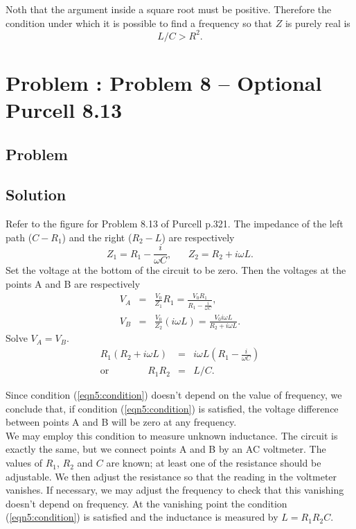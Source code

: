 \documentclass[solutions]{esg8022pset}
\begin{document}
Noth that the argument inside a square root must be positive.
Therefore the condition under which it is possible to find
a frequency so that $Z$ is purely real is
\begin{equation}
L/C>R^2.
\end{equation}
\section{Problem \thesection: Problem 8 -- Optional Purcell 8.13}
\subsection{Problem}
\subsection{Solution}
Refer to the figure for Problem 8.13 of Purcell p.321.  The impedance
of the left path ($C-R_1$) and the right ($R_2 - L$) are respectively
\[Z_1=R_1-\frac{i}{\omega C},\;\;\;\;\;\; Z_2=R_2+i\omega L.\]
Set the voltage at the bottom of the circuit to be zero.  Then the
voltages at the points A and B are respectively
\begin{eqnarray}
V_A &=& \frac{V_0}{Z_1} R_1= \frac{V_0 R_1}{R_1-\frac{i}{\omega
C}},\nonumber\\
V_B &=& \frac{V_0}{Z_2} (i\omega L)=\frac{V_0 i\omega L}{R_2+i\omega L}.
\end{eqnarray}
Solve $V_A=V_B$.
\begin{eqnarray}
R_1(R_2+i\omega L) &=& i\omega L (R_1-\frac{i}{\omega C})\nonumber\\
\textrm{or}\qquad\qquad R_1 R_2 &=& L/C.\label{eqn5:condition}
\end{eqnarray}

Since condition (\ref{eqn5:condition}) doesn't depend on the value of
frequency, we conclude that, if condition (\ref{eqn5:condition}) is
satisfied, the voltage difference between points A and B will be zero
at any frequency.\\

We may employ this condition to measure unknown inductance.  The
circuit is exactly the same, but we connect points A and B by an AC
voltmeter.  The values of $R_1$, $R_2$ and $C$ are known; at least one
of the resistance should be adjustable.  We then adjust the resistance
so that the reading in the voltmeter vanishes.  If necessary, we may
adjust the frequency to check that this vanishing doesn't depend on
frequency.  At the vanishing point the condition
(\ref{eqn5:condition}) is satisfied and the inductance is measured by
$L=R_1 R_2 C$.
\end{document}
